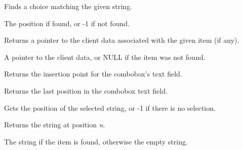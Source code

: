 
Finds a choice matching the given string.




The position if found, or -1 if not found.

\label{wxcomboboxgetclientdata}


Returns a pointer to the client data associated with the given item (if any).




A pointer to the client data, or NULL if the item was not found.

\label{wxcomboboxgetinsertionpoint}


Returns the insertion point for the combobox's text field.

\label{wxcomboboxgetlastposition}


Returns the last position in the combobox text field.

\label{wxcomboboxgetselection}


Gets the position of the selected string, or -1 if there is no selection.

\label{wxcomboboxgetstring}


Returns the string at position {\it n}.




The string if the item is found, otherwise the empty string.


